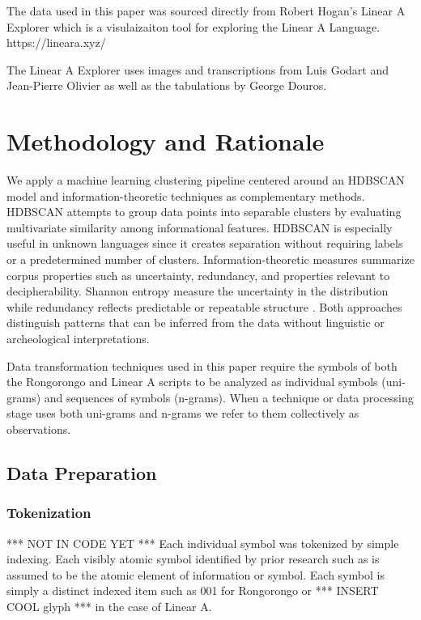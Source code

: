 \documentclass[preprint,12pt]{elsarticle}
\begin{document}
The data used in this paper was sourced directly from Robert Hogan's Linear A Explorer which is a visulaizaiton tool for exploring the Linear A Language. \cite{karajgikar2025_linear_a}
https://lineara.xyz/

The Linear A Explorer uses images and transcriptions from Luis Godart and Jean-Pierre Olivier \cite{salgarella2021_sigla}
as well as the tabulations by George Douros. \cite{karajgikar2025_linear_a}
\cite{}

\section{Methodology and Rationale}
\label{meth}
We apply a machine learning clustering pipeline centered around an HDBSCAN model and information-theoretic techniques as complementary methods. HDBSCAN attempts to group data points into separable clusters by evaluating multivariate similarity among informational features. HDBSCAN is especially useful in unknown languages since it creates separation without requiring labels or a predetermined number of clusters. Information-theoretic measures summarize corpus properties such as uncertainty, redundancy, and properties relevant to decipherability. Shannon entropy measure the uncertainty in the distribution while redundancy reflects predictable or repeatable structure \cite{shannon1945_mathematical_cryptography}. Both approaches distinguish patterns that can be inferred from the data without linguistic or archeological interpretations. 

Data transformation techniques used in this paper require the symbols of both the Rongorongo and Linear A scripts to be analyzed as individual symbols (uni-grams) and sequences of symbols (n-grams). When a technique or data processing stage uses both uni-grams and n-grams we refer to them collectively as observations.

\subsection{Data Preparation}
\subsubsection{Tokenization} *** NOT IN CODE YET ***
Each individual symbol was tokenized by simple indexing. Each visibly atomic symbol identified by prior research such as \cite{barthel1958grundlagen} \cite{salgarella2021_sigla} \cite{yadav2010_indus_ngrams} is assumed to be the atomic element of information or symbol. Each symbol is simply a distinct indexed item such as 001 for Rongorongo or *** INSERT COOL glyph *** in the case of Linear A. 
\end{document}
